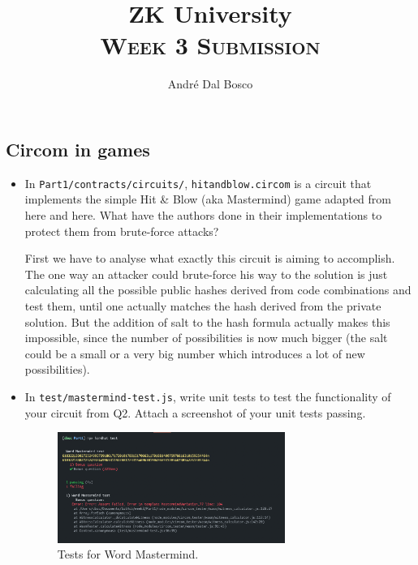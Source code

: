 \documentclass{article}
\title{ZK University \\[4pt] \normalsize\textsc{Week 3 Submission}}
\author{André Dal Bosco \\ \small{\email \quad \discord}}
\begin{document}
\maketitle

\subsection*{Circom in games}
\begin{itemize}
    \item In \texttt{Part1/contracts/circuits/}, \texttt{hitandblow.circom} is a circuit that implements the simple Hit \& Blow (aka Mastermind) game adapted from here and here. What have the authors done in their implementations to protect them from brute-force attacks? \par First we have to analyse what exactly this circuit is aiming to accomplish. The one way an attacker could brute-force his way to the solution is just calculating all the possible public hashes derived from code combinations and test them, until one actually matches the hash derived from the private solution. But the addition of salt to the hash formula actually makes this impossible, since the number of possibilities is now much bigger (the salt could be a small or a very big number which introduces a lot of new possibilities).
    \item In \texttt{test/mastermind-test.js}, write unit tests to test the functionality of your circuit from Q2. Attach a screenshot of your unit tests passing.
    \begin{figure}[h]
        \centering
        \includegraphics[width=0.7\textwidth]{test.png}
        \caption*{Tests for Word Mastermind.}
    \end{figure}


\end{itemize}
\end{document}
